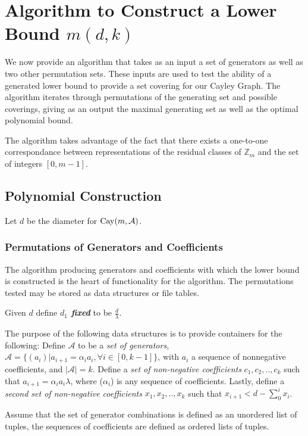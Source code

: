 \section{Algorithm to Construct a Lower Bound $m(d, k)$}

We now provide an algorithm that takes as an input a set of generators as well as two other permutation sets. These inputs are used to test the ability of a generated lower bound to provide a set covering for our Cayley Graph. The algorithm iterates through permutations of the generating set and possible coverings, giving as an output the maximal generating set as well as the optimal polynomial bound.

\noindent
The algorithm takes advantage of the fact that there exists a one-to-one correspondance between representations of the residual classes of $\mathbb{Z}_{m}$ and the set of integers $[0, m-1]$.\n

\subsection{Polynomial Construction}
\noindent
Let $d$ be the diameter for $\operatorname{Cay}(m, \mathcal{A})$.\n 

\subsubsection{Permutations of Generators and Coefficients}
The algorithm producing generators and coefficients with which the lower bound is constructed is the heart of functionality for the algorithm. \n
The permutations tested may be stored as data structures or file tables.

\noindent
Given $d$ define \emph{\bf{$d_{1}$ fixed}} to be $\frac{d}{\lambda}$.\n

\noindent
The purpose of the following data structures is to provide containers for the following:\n
Define $\mathcal{A}$ to be a \emph{set of generators}, $\mathcal{A} = \{ (a_{i}) \vert a_{i+1} = \alpha_{i}a_{i},  \forall i \in [0, k-1] \} $, with $a_i$ a sequence of nonnegative coefficients, and $\vert \mathcal{A} \vert = k$.\n
Define a \emph{set of non-negative coefficients} $c_{1}, c_{2}, .. , c_{k}$ such that $a_{i+1} = \alpha_{i}a_{i} \lambda$, where ($\alpha_{i}$) is any sequence of coefficients.\n
Lastly, define a \emph{second set of non-negative coefficients} $x_{1}, x_{2}, .., x_{k}$ such that $x_{i+1} < d - \sum_{0}^{i}x_{i}$.

\noindent
Assume that the set of generator combinations is defined as an unordered list of tuples, the sequences of coefficients are defined as ordered lists of tuples.

